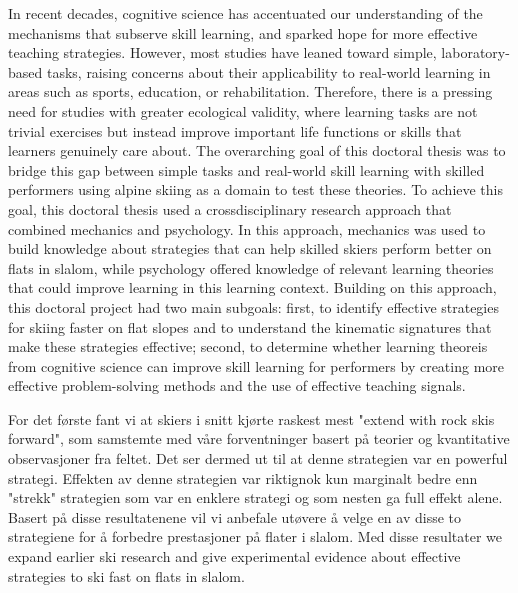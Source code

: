 













In recent decades, cognitive science has accentuated our understanding of the mechanisms that subserve skill learning, and sparked hope for more effective teaching strategies. However, most studies have leaned toward simple, laboratory-based tasks, raising concerns about their applicability to real-world learning in areas such as sports, education, or rehabilitation. Therefore, there is a pressing need for studies with greater ecological validity, where learning tasks are not trivial exercises but instead improve important life functions or skills that learners genuinely care about. The overarching goal of this doctoral thesis was to bridge this gap between simple tasks and real-world skill learning with skilled performers using alpine skiing as a domain to test these theories. To achieve this goal, this doctoral thesis used a crossdisciplinary research approach that combined mechanics and psychology. In this approach, mechanics was used to build knowledge about strategies that can help skilled skiers perform better on flats in slalom, while psychology offered knowledge of relevant learning theories that could improve learning in this learning context. Building on this approach, this doctoral project had two main subgoals: first, to identify effective strategies for skiing faster on flat slopes and to understand the kinematic signatures that make these strategies effective; second, to determine whether learning theoreis from cognitive science can improve skill learning for performers by creating more effective problem-solving methods and the use of effective teaching signals.

For det første fant vi at skiers i snitt kjørte raskest mest "extend with rock skis forward", som samstemte med våre forventninger basert på teorier og kvantitative observasjoner fra feltet. Det ser dermed ut til at denne strategien var en powerful strategi. Effekten av denne strategien var riktignok kun marginalt bedre enn "strekk" strategien som var en enklere strategi og som nesten ga full effekt alene. Basert på disse resultatenene vil vi anbefale utøvere å velge en av disse to strategiene for å forbedre prestasjoner på flater i slalom. Med disse resultater we expand earlier ski research and give experimental evidence about effective strategies to ski fast on flats in slalom. 

